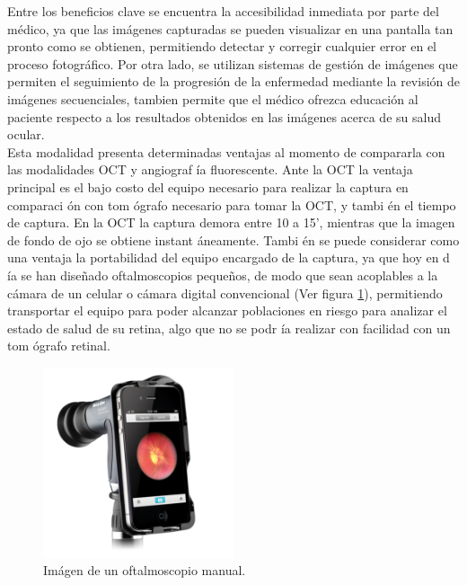 Entre los beneficios clave se encuentra la accesibilidad inmediata por parte del m\'edico, ya que las im\'agenes capturadas se pueden visualizar en una pantalla tan pronto como se obtienen, permitiendo detectar y corregir cualquier error en el proceso fotogr\'afico. Por otra lado, se utilizan sistemas de gesti\'on de im\'agenes que permiten el seguimiento de la progresi\'on de la enfermedad mediante la revisi\'on de im\'agenes secuenciales, tambien permite que el m\'edico ofrezca educaci\'on al paciente respecto a los resultados obtenidos en las im\'agenes acerca de su salud ocular. \cite{cunha2004blood}\\
Esta modalidad presenta determinadas ventajas al momento de compararla con las modalidades OCT y angiograf \'ia fluorescente. 
Ante la OCT la ventaja principal es el bajo costo del equipo necesario para realizar la captura en comparaci \'on con tom \'ografo necesario para tomar la OCT, y tambi \'en el tiempo de captura. En la OCT la captura demora entre 10 a 15’, mientras que la imagen de fondo de ojo se obtiene instant \'aneamente. Tambi \'en se puede considerar como una ventaja la portabilidad del equipo encargado de la captura, ya que hoy en d \'ia se han diseñado oftalmoscopios peque\~nos, de modo que sean acoplables a la c\'amara de un celular o c\'amara digital convencional (Ver figura \ref{fig:OftalmoscopioManual}), permitiendo transportar el equipo para poder alcanzar poblaciones en riesgo para analizar el estado de salud de su retina, algo que no se podr \'ia realizar con facilidad con un tom \'ografo retinal.

\begin{figure}[H]
	{
	\centering
	\includegraphics[width=0.5\textwidth]{Figures/oftalmoscopioManual}
	\caption[Ofaltmosocpio Manual]{Im\'agen de un oftalmoscopio manual.}
	\label{fig:OftalmoscopioManual}
	}
\end{figure}

